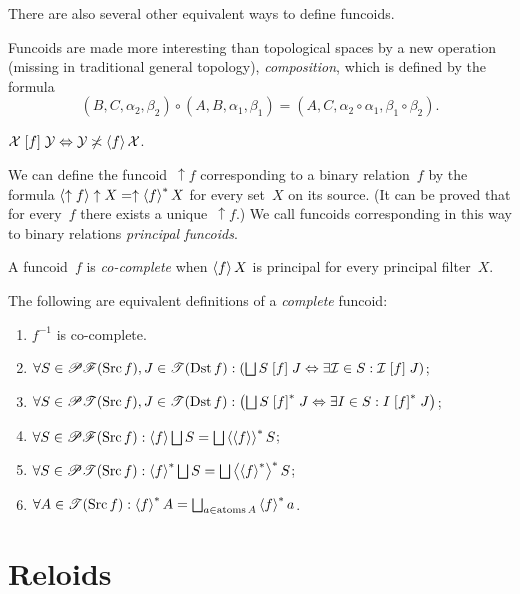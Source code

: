 \documentclass{amsart}
\begin{document}
There are also several other equivalent ways to define funcoids.

Funcoids are made more interesting than topological spaces by a new operation (missing in traditional general topology),
\emph{composition}, which is defined by the formula
\[ (B,C,\alpha_2,\beta_2)\circ (A,B,\alpha_1,\beta_1) = (A,C,\alpha_2\circ\alpha_1,\beta_1\circ\beta_2). \]

\begin{defn}
$\mathcal{X}\mathrel{\left[f\right]}\mathcal{Y} \Leftrightarrow \mathcal{Y}\not\asymp\left\langle f\right\rangle\mathcal{X}$.
\end{defn}

We can define the funcoid~$\uparrow f$ corresponding to a binary relation~$f$ by the formula $\left\langle \uparrow f\right\rangle\uparrow X=\uparrow\left\langle f\right\rangle ^{\ast}X$ for every set~$X$ on its source. (It can be proved that for every~$f$ there exists a unique~$\uparrow f$.) We call funcoids corresponding in this way to binary relations \emph{principal funcoids}.

\begin{defn}
A funcoid~$f$ is \emph{co-complete} when $\left\langle f\right\rangle X$ is principal for every principal filter~$X$.
\end{defn}

The following are equivalent definitions of a \emph{complete} funcoid:

\begin{enumerate}
\item $f^{-1}$ is co-complete.
\item \label{cfcd:r-filt}$\forall S\in\subsets\mathscr{F}(\Src
f),J\in\mathscr{T}(\Dst f):\left(\bigsqcup S\suprel
fJ\Leftrightarrow\exists\mathcal{I}\in S:\mathcal{I}\suprel fJ\right)$;
\item \label{cfcd:r-set}$\forall S\in\subsets\mathscr{T}(\Src f),J\in\mathscr{T}(\Dst
f):\left(\bigsqcup S\rsuprel fJ\Leftrightarrow\exists I\in S:I\rsuprel
fJ\right)$;
\item \label{cfcd:f-filt}$\forall S\in\subsets\mathscr{F}(\Src f):\supfun
f\bigsqcup S=\bigsqcup\rsupfun{\supfun f}S$;
\item \label{cfcd:f-set}$\forall S\in\subsets\mathscr{T}(\Src f):\rsupfun
f\bigsqcup S=\bigsqcup\rsupfun{\rsupfun f}S$;
\item \label{cfcd:sing}$\forall A\in\mathscr{T}(\Src f):\rsupfun
fA=\bigsqcup_{a\in\atoms A}\rsupfun fa$.
\end{enumerate}


\section{Reloids}
\end{document}
